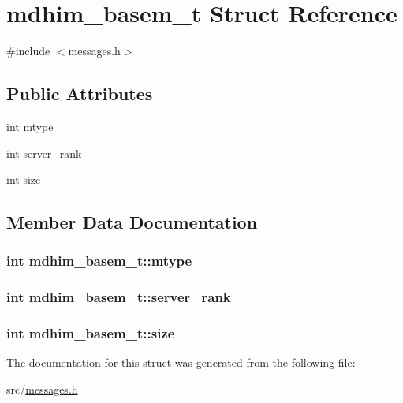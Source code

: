 \hypertarget{structmdhim__basem__t}{\section{mdhim\-\_\-basem\-\_\-t Struct Reference}
\label{structmdhim__basem__t}
}


{\ttfamily \#include $<$messages.\-h$>$}

\subsection*{Public Attributes}
\begin{DoxyCompactItemize}
\item 
int \hyperlink{structmdhim__basem__t_a3697e7a3c6c37abc3f267277123b02b6}{mtype}
\item 
int \hyperlink{structmdhim__basem__t_ab4a85c0bf2c05d68805fe5126d670b94}{server\-\_\-rank}
\item 
int \hyperlink{structmdhim__basem__t_a42bc98b866212b4cc4c8874327434c0e}{size}
\end{DoxyCompactItemize}


\subsection{Member Data Documentation}
\hypertarget{structmdhim__basem__t_a3697e7a3c6c37abc3f267277123b02b6}{
\subsubsection[{mtype}]{\setlength{\rightskip}{0pt plus 5cm}int mdhim\-\_\-basem\-\_\-t\-::mtype}}\label{structmdhim__basem__t_a3697e7a3c6c37abc3f267277123b02b6}
\hypertarget{structmdhim__basem__t_ab4a85c0bf2c05d68805fe5126d670b94}{
\subsubsection[{server\-\_\-rank}]{\setlength{\rightskip}{0pt plus 5cm}int mdhim\-\_\-basem\-\_\-t\-::server\-\_\-rank}}\label{structmdhim__basem__t_ab4a85c0bf2c05d68805fe5126d670b94}
\hypertarget{structmdhim__basem__t_a42bc98b866212b4cc4c8874327434c0e}{
\subsubsection[{size}]{\setlength{\rightskip}{0pt plus 5cm}int mdhim\-\_\-basem\-\_\-t\-::size}}\label{structmdhim__basem__t_a42bc98b866212b4cc4c8874327434c0e}


The documentation for this struct was generated from the following file\-:\begin{DoxyCompactItemize}
\item 
src/\hyperlink{messages_8h}{messages.\-h}\end{DoxyCompactItemize}
